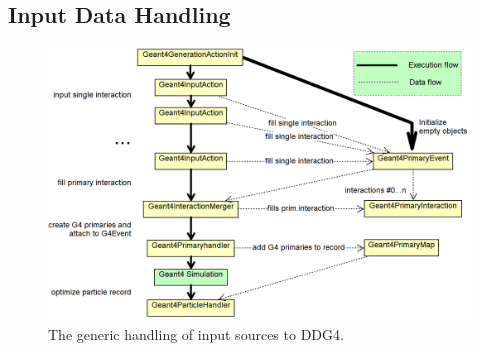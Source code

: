 \documentclass[10pt,a4paper]{article}
\begin{document}
\subsection{Input Data Handling}
\label{sec:ddg4-implementation-input-handling}
\begin{figure}[t]
  \begin{center}
    \includegraphics[width=160mm] {DDG4_input_stage.png}
    \caption{The generic handling of input sources to DDG4.}
    \label{fig:ddg4-input-stage}
  \end{center}
\end{figure}
\end{document}

